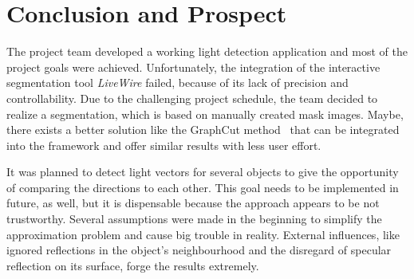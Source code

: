 \section{Conclusion and Prospect} \label{sec:Conclusion}
The project team developed a working light detection application and most of the project goals were achieved. Unfortunately, the integration of the interactive segmentation tool \textit{LiveWire} failed, because of its lack of precision and controllability. Due to the challenging project schedule, the team decided to realize a segmentation, which is based on manually created mask images. Maybe, there exists a better solution like the GraphCut method~\cite{Rother:2004} that can be integrated into the framework and offer similar results with less user effort.

It was planned to detect light vectors for several objects to give the opportunity of comparing the directions to each other. This goal needs to be implemented in future, as well, but it is dispensable because the approach appears to be not trustworthy. Several assumptions were made in the beginning to simplify the approximation problem and cause big trouble in reality. External influences, like ignored reflections in the object's neighbourhood and the disregard of specular reflection on its surface, forge the results extremely. 























